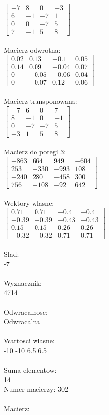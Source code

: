 \documentclass[a4paper,12pt]{article}
\begin{document}
$\begin{bmatrix} -7&8&0&-3\\6&-1&-7&1\\0&0&-7&5\\7&-1&5&8 \end{bmatrix}$
\\
\\
Macierz odwrotna:\\

$\begin{bmatrix} 0.02&0.13&-0.1&0.05\\0.14&0.09&-0.04&0.07\\0&-0.05&-0.06&0.04\\0&-0.07&0.12&0.06 \end{bmatrix}$
\\
\\
Macierz transponowana:\\

$\begin{bmatrix} -7&6&0&7\\8&-1&0&-1\\0&-7&-7&5\\-3&1&5&8 \end{bmatrix}$
\\
\\
Macierz do potegi 3:\\

$\begin{bmatrix} -863&664&949&-604\\253&-330&-993&108\\-240&280&-458&300\\756&-108&-92&642 \end{bmatrix}$
\\
\\
Wektory wlasne:\\

$\begin{bmatrix} 0.71&0.71&-0.4&-0.4\\-0.39&-0.39&-0.43&-0.43\\0.15&0.15&0.26&0.26\\-0.32&-0.32&0.71&0.71 \end{bmatrix}$
\\
\\
Slad:\\
-7
\\
\\
Wyznacznik:\\
4714
\\
\\
Odwracalnosc:\\
Odwracalna
\\
\\
Wartosci wlasne:\\
-10 -10 6.5 6.5
\\
\\
Suma elementow:\\
14
\\
\newpage
Numer macierzy:
302
\\
\\
Macierz:\\
\end{document}
